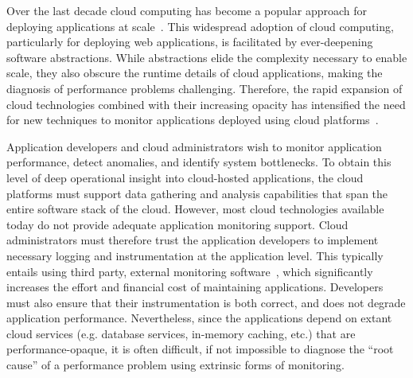 Over the last decade cloud computing has become a popular approach for deploying
applications at scale~\cite{Antonopoulos:2010:CCP:1855007,Pinheiro:2014:ACC:2618168.2618188}. 
This widespread adoption of cloud computing, particularly for deploying
web applications, is facilitated by ever-deepening software abstractions.
While abstractions elide the complexity necessary to enable scale,
they also obscure the runtime details of cloud applications, 
making the diagnosis of performance problems challenging.
Therefore, the rapid expansion of cloud technologies
combined with their increasing opacity has intensified the need 
for new techniques to
monitor applications deployed using cloud platforms~\cite{DaCunhaRodrigues:2016:MCC:2851613.2851619}. 

Application developers and cloud administrators wish to monitor 
application performance, detect anomalies, and identify system bottlenecks. To obtain 
this level of deep operational insight into cloud-hosted applications, the cloud platforms must support 
data gathering and analysis capabilities that span the entire software stack of the cloud. 
However, most cloud technologies available
today do not provide adequate application monitoring support. Cloud administrators must therefore trust the
application developers to implement necessary logging and instrumentation 
at the application level. This typically entails using third party, external monitoring software~\cite{newrelic,datadog,dynatrace},
which significantly increases the effort and financial cost of maintaining applications.
Developers must also ensure
that their instrumentation is both correct, and does not degrade 
application performance.  Nevertheless, since the applications depend on extant
cloud services (e.g. database services, 
in-memory caching, etc.) that are performance-opaque, it is
often difficult, if not impossible to diagnose the ``root cause'' of a performance problem
using extrinsic forms of monitoring.

